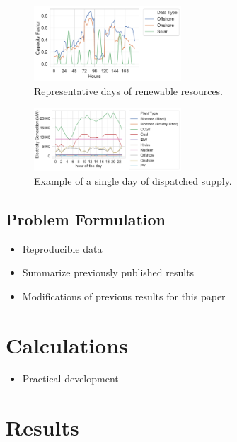 \documentclass[final,3p,times,twocolumn,numbers]{elsarticle}
\begin{document}
\begin{figure}
\centering
\includegraphics[width=0.49\textwidth]{figures/methods_and_materials/clusters_results_resources.pdf}
\caption{Representative days of renewable resources.}
\label{fig:clusters_compared_resources}
\end{figure}

\begin{figure}
\centering
\includegraphics[width=0.49\textwidth]{figures/methods_and_materials/clusters_results_single_day.pdf}
\caption{Example of a single day of dispatched supply.}
\label{fig:clusters_compared_load}
\end{figure}
 
\subsection{Problem Formulation}




\begin{itemize}
	\item Reproducible data
	\item Summarize previously published results
	\item Modifications of previous results for this paper
\end{itemize}

\section{Calculations}
\label{sec:calculations}

\begin{itemize}
	\item Practical development
\end{itemize}

\section{Results}
\label{sec:results}
\end{document}
